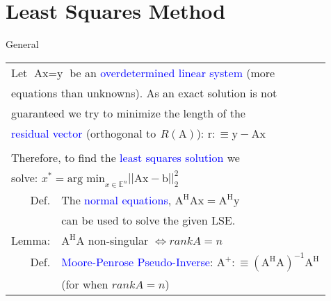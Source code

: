 \section{Least Squares Method}
\begin{howtobox}{General}
\setlength{\tabcolsep}{2pt}
\begin{tabular}{rl}
	\multicolumn{2}{l}{Let $\text{Ax} = \text{y}$ be an \textcolor{blue}{overdetermined linear system} (more}\\
	\multicolumn{2}{l}{equations than unknowns). As an exact solution is not}\\
	\multicolumn{2}{l}{guaranteed we try to minimize the length of the}\\
	\multicolumn{2}{l}{\textcolor{blue}{residual vector} (orthogonal to $^{}R(\text{A})$): $\text{r} :\equiv \text{y} - \text{Ax}$}\\
	\\
	\multicolumn{2}{l}{Therefore, to find the \textcolor{blue}{least squares solution} we}\\
	\multicolumn{2}{l}{solve: $x^* = \text{arg min}_{x\in\mathbb{E}^n}||\text{Ax}-\text{b}||_2^2$}\\
	\rule{0pt}{3ex}
	Def. & The \textcolor{blue}{normal equations}, $\text{A}^\text{H}\text{Ax} = \text{A}^\text{H}\text{y}$\\
	& can be used to solve the given LSE.\\
	Lemma: & $\text{A}^\text{H}\text{A}$ non-singular $\Leftrightarrow rankA = n$\\
	\rule{0pt}{3ex}
	Def. & \textcolor{blue}{Moore-Penrose Pseudo-Inverse}: $\text{A}^+ :\equiv (\text{A}^\text{H}\text{A})^{-1}\text{A}^\text{H}$\\
	& (for when $rankA = n$)\\
\end{tabular}
\end{howtobox}